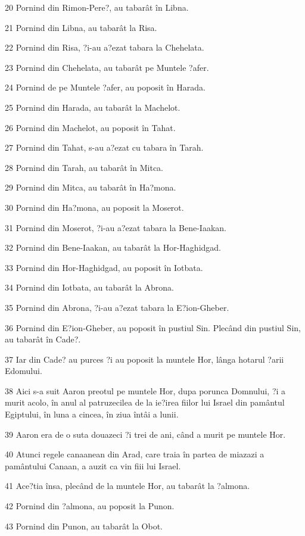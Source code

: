 \par 20 Pornind din Rimon-Pere?, au tabarât în Libna.
\par 21 Pornind din Libna, au tabarât la Risa.
\par 22 Pornind din Risa, ?i-au a?ezat tabara la Chehelata.
\par 23 Pornind din Chehelata, au tabarât pe Muntele ?afer.
\par 24 Pornind de pe Muntele ?afer, au poposit în Harada.
\par 25 Pornind din Harada, au tabarât la Machelot.
\par 26 Pornind din Machelot, au poposit în Tahat.
\par 27 Pornind din Tahat, s-au a?ezat cu tabara în Tarah.
\par 28 Pornind din Tarah, au tabarât în Mitca.
\par 29 Pornind din Mitca, au tabarât în Ha?mona.
\par 30 Pornind din Ha?mona, au poposit la Moserot.
\par 31 Pornind din Moserot, ?i-au a?ezat tabara la Bene-Iaakan.
\par 32 Pornind din Bene-Iaakan, au tabarât la Hor-Haghidgad.
\par 33 Pornind din Hor-Haghidgad, au poposit în Iotbata.
\par 34 Pornind din Iotbata, au tabarât la Abrona.
\par 35 Pornind din Abrona, ?i-au a?ezat tabara la E?ion-Gheber.
\par 36 Pornind din E?ion-Gheber, au poposit în pustiul Sin. Plecând din pustiul Sin, au tabarât în Cade?.
\par 37 Iar din Cade? au purces ?i au poposit la muntele Hor, lânga hotarul ?arii Edomului.
\par 38 Aici s-a suit Aaron preotul pe muntele Hor, dupa porunca Domnului, ?i a murit acolo, în anul al patruzecilea de la ie?irea fiilor lui Israel din pamântul Egiptului, în luna a cincea, în ziua întâi a lunii.
\par 39 Aaron era de o suta douazeci ?i trei de ani, când a murit pe muntele Hor.
\par 40 Atunci regele canaanean din Arad, care traia în partea de miazazi a pamântului Canaan, a auzit ca vin fiii lui Israel.
\par 41 Ace?tia însa, plecând de la muntele Hor, au tabarât la ?almona.
\par 42 Pornind din ?almona, au poposit la Punon.
\par 43 Pornind din Punon, au tabarât la Obot.
